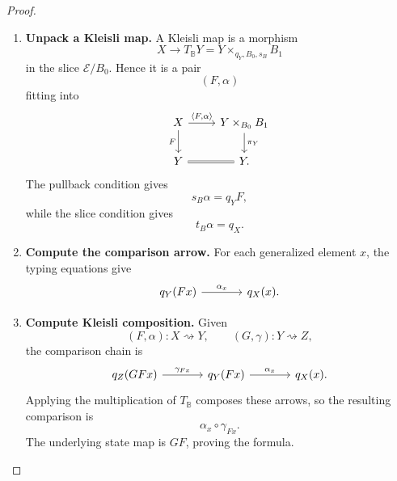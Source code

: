 \begin{proof}
    \leavevmode
    \begin{enumerate}
        \item \textbf{Unpack a Kleisli map.}
        A Kleisli map is a morphism
        \[
            X\to T_{\mathbb B}Y
            =
            Y\times_{q_Y,B_0,s_B}B_1
        \]
        in the slice \(\mathcal E/B_0\). Hence it is a pair
        \[
            (F,\alpha)
        \]
        fitting into
        \[
        \begin{tikzcd}
            X
                \arrow[r, "{\langle F,\alpha\rangle}"]
                \arrow[d, "F"']
            &
            Y\times_{B_0}B_1
                \arrow[d, "\pi_Y"]
            \\
            Y
                \arrow[r, equal]
            &
            Y.
        \end{tikzcd}
        \]
        The pullback condition gives
        \[
            s_B\alpha=q_YF,
        \]
        while the slice condition gives
        \[
            t_B\alpha=q_X.
        \]

        \item \textbf{Compute the comparison arrow.}
        For each generalized element \(x\), the typing equations give
        \[
        \begin{tikzcd}[column sep=large]
            q_Y(Fx)
                \arrow[r, "\alpha_x"]
            &
            q_X(x).
        \end{tikzcd}
        \]

        \item \textbf{Compute Kleisli composition.}
        Given
        \[
            (F,\alpha):X\rightsquigarrow Y,
            \qquad
            (G,\gamma):Y\rightsquigarrow Z,
        \]
        the comparison chain is
        \[
        \begin{tikzcd}[column sep=large]
            q_Z(GFx)
                \arrow[r, "\gamma_{Fx}"]
            &
            q_Y(Fx)
                \arrow[r, "\alpha_x"]
            &
            q_X(x).
        \end{tikzcd}
        \]
        Applying the multiplication of \(T_{\mathbb B}\) composes these
        arrows, so the resulting comparison is
        \[
            \alpha_x\circ\gamma_{Fx}.
        \]
        The underlying state map is \(GF\), proving the formula.
    \end{enumerate}
\end{proof}

